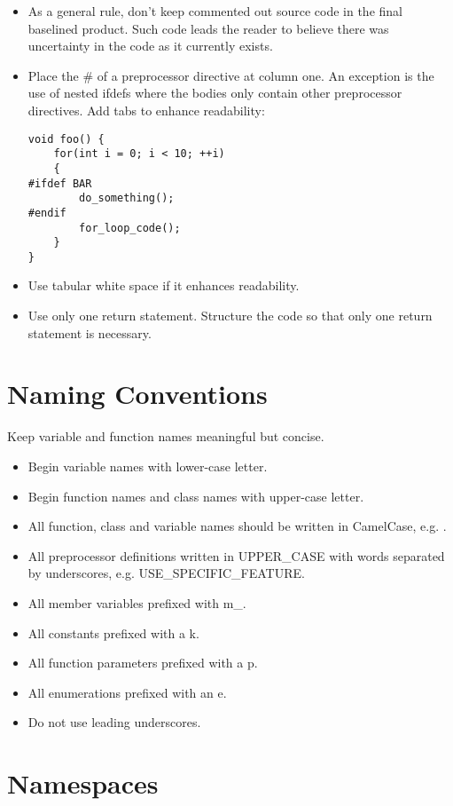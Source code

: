 \begin{itemize}
\item As a general rule, don’t keep commented out source code in the final
baselined product. Such code leads the reader to believe there was uncertainty 
in the code as it currently exists.
\item Place the \# of a preprocessor directive at column one. An exception is
the use of nested ifdefs where the bodies only contain other preprocessor directives.
Add tabs to enhance readability:
\begin{lstlisting}[style=C++Style]
void foo() { 
    for(int i = 0; i < 10; ++i) 
    { 
#ifdef BAR 
        do_something(); 
#endif
        for_loop_code(); 
    }
}
\end{lstlisting}
\item Use tabular white space if it enhances
readability.
\item Use only one return statement. Structure the code so that only one return
statement is necessary.
\end{itemize}

\section{Naming Conventions}

Keep variable and function names meaningful but concise.
\begin{itemize}
\item Begin variable names with lower-case letter.
\item Begin function names and class names with upper-case letter.
\item All function, class and variable names should be written in CamelCase,
e.g. .
\item All preprocessor definitions written in UPPER\_CASE with words separated
by underscores, e.g. USE\_SPECIFIC\_FEATURE.
\item All member variables prefixed with m\_.
\item All constants prefixed with a k.
\item All function parameters prefixed with a p.
\item All enumerations prefixed with an e.
\item Do not use leading underscores.
\end{itemize}

\section{Namespaces}

